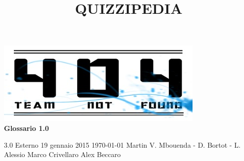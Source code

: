 \documentclass[a4paper,11pt]{article}
\title{\textbf{{\fontsize{8mm}{5mm}\selectfont QUIZZIPEDIA}}}
\begin{document}
	\maketitle
	\thispagestyle{empty}

	\begin{center}
		\includegraphics{../../team_not_found.jpg}\\
		\vspace{20mm}
		\textbf{{\Large Glossario 1.0}}	
	\end{center}

	\thispagestyle{empty}	%
			{3.0} 							%
			{Esterno} 						%
			{19 gennaio 2015} 				%
			{\today} 						%
			{Martin V. Mbouenda - D. Bortot - L. Alessio}		%
			{Marco Crivellaro} 			%
			{Alex Beccaro}					%
			
	\newpage
	\fancyfoot[R]{\thepage}
\end{document}
